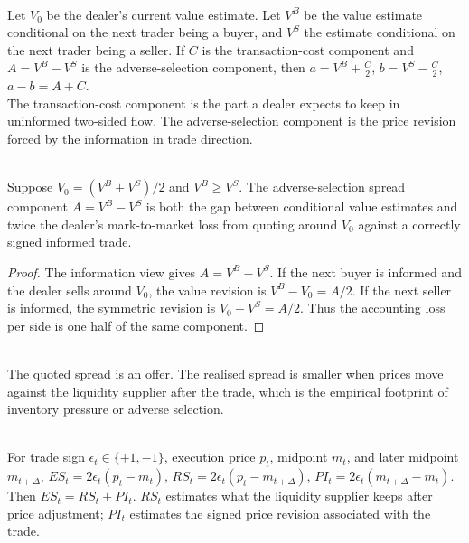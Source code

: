 \begin{model} \\
Let $V_0$ be the dealer's current value estimate. Let $V^B$ be the value estimate conditional on the next trader being a buyer, and $V^S$ the estimate conditional on the next trader being a seller. If $C$ is the transaction-cost component and $A=V^B-V^S$ is the adverse-selection component, then $a=V^B+\frac{C}{2}$, $b=V^S-\frac{C}{2}$, $a-b=A+C$.\\
The transaction-cost component is the part a dealer expects to keep in uninformed two-sided flow. The adverse-selection component is the price revision forced by the information in trade direction.
\end{model}

\begin{proposition} \\
Suppose $V_0=(V^B+V^S)/2$ and $V^B\geq V^S$. The adverse-selection spread component $A=V^B-V^S$ is both the gap between conditional value estimates and twice the dealer's mark-to-market loss from quoting around $V_0$ against a correctly signed informed trade.
\begin{proof}
The information view gives $A=V^B-V^S$. If the next buyer is informed and the dealer sells around $V_0$, the value revision is $V^B-V_0=A/2$. If the next seller is informed, the symmetric revision is $V_0-V^S=A/2$. Thus the accounting loss per side is one half of the same component.
\end{proof}
\end{proposition}

\begin{principle} \\
The quoted spread is an offer. The realised spread is smaller when prices move against the liquidity supplier after the trade, which is the empirical footprint of inventory pressure or adverse selection.
\end{principle}

\begin{model} \\
For trade sign $\epsilon_t\in\{+1,-1\}$, execution price $p_t$, midpoint $m_t$, and later midpoint $m_{t+\Delta}$, $ES_t=2\epsilon_t(p_t-m_t)$, $RS_t=2\epsilon_t(p_t-m_{t+\Delta})$, $PI_t=2\epsilon_t(m_{t+\Delta}-m_t)$. Then $ES_t=RS_t+PI_t$. $RS_t$ estimates what the liquidity supplier keeps after price adjustment; $PI_t$ estimates the signed price revision associated with the trade.
\end{model}

